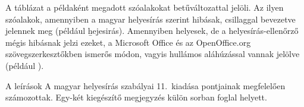 A táblázat a példaként megadott szóalakokat 
betűváltozattal jelöli. Az ilyen szóalakok, amennyiben
a magyar helyesírás szerint hibásak, csillaggal bevezetve
jelennek meg (például \b{hejesirás}).
Amennyiben helyesek, de a helyesírás-ellenőrző mégis
hibásnak jelzi ezeket, a
Microsoft Office és az OpenOffice.org szövegszerkesztőkben
ismerős módon, vagyis hullámos aláhúzással
vannak jelölve (például ).

A leírások A magyar helyesírás szabályai 11.~kiadása pontjainak megfelelően
számozottak.
Egy-két kiegészítő megjegyzés külön sorban foglal helyett.


